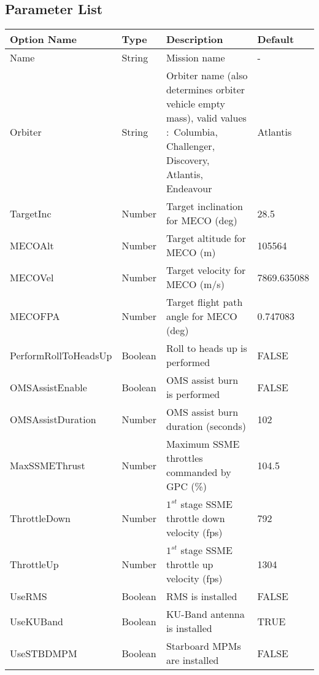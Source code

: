 \documentclass[Space_Shuttle_Ultra_Manual.tex]{subfiles}
\begin{document}
\newpage

\subsection{Parameter List}
\begin{table}[H]
  \centering
  \begin{tabular}{|l|p{1.5cm}|p{7.5cm}|l|}
	\hline
	\rule{0pt}{2ex}
	\textbf{Option Name} & \textbf{Type} & \textbf{Description} & \textbf{Default}\\
	\hline
	\rule{0pt}{2ex}
	Name & String & Mission name & -\\
	\hline
	\rule{0pt}{2ex}
	Orbiter & String & Orbiter name (also determines orbiter vehicle empty mass), valid values$\colon$ Columbia, Challenger, Discovery, Atlantis, Endeavour & Atlantis\\
	\hline
	\rule{0pt}{2ex}
	TargetInc & Number & Target inclination for MECO (deg) & 28.5\\
	\hline
	\rule{0pt}{2ex}
	MECOAlt & Number & Target altitude for MECO (m) & 105564\\
	\hline
	\rule{0pt}{2ex}
	MECOVel & Number & Target velocity for MECO (m/s) & 7869.635088\\
	\hline
	\rule{0pt}{2ex}
	MECOFPA & Number & Target flight path angle for MECO (deg) & 0.747083\\
	\hline
	\rule{0pt}{2ex}
	PerformRollToHeadsUp & Boolean & Roll to heads up is performed & FALSE\\
	\hline
	\rule{0pt}{2ex}
	OMSAssistEnable & Boolean & OMS assist burn is performed & FALSE\\
	\hline
	\rule{0pt}{2ex}
	OMSAssistDuration & Number & OMS assist burn duration (seconds) & 102\\
	\hline
	\rule{0pt}{2ex}
	MaxSSMEThrust & Number & Maximum SSME throttles commanded by GPC (\%) & 104.5\\
	\hline
	\rule{0pt}{2ex}
	ThrottleDown & Number & $1^{st}$ stage SSME throttle down velocity (fps) & 792\\
	\hline
	\rule{0pt}{2ex}
	ThrottleUp & Number & $1^{st}$ stage SSME throttle up velocity (fps) & 1304\\
	\hline
	\rule{0pt}{2ex}
	UseRMS & Boolean & RMS is installed & FALSE\\
	\hline
	\rule{0pt}{2ex}
	UseKUBand & Boolean & KU-Band antenna is installed & TRUE\\
	\hline
	\rule{0pt}{2ex}
	UseSTBDMPM & Boolean & Starboard MPMs are installed & FALSE\\

\end{tabular}
\end{table}
\end{document}
